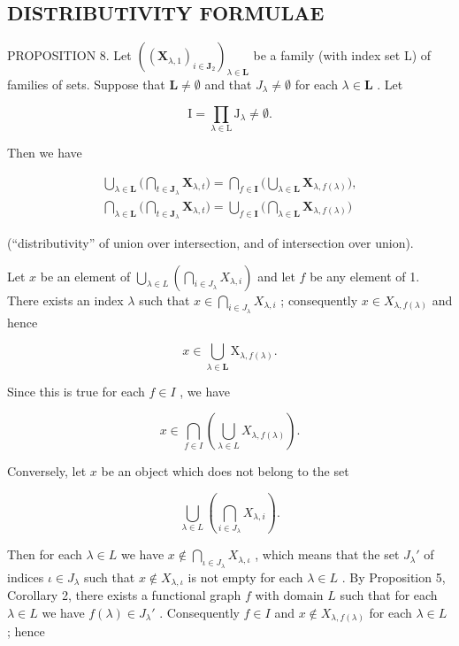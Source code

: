 \subsection{DISTRIBUTIVITY FORMULAE}

PROPOSITION 8. Let \(((\mathbf{X}_{\lambda,1})_{i\in \mathbf{J}_2})_{\lambda \in \mathbf{L}}\) be a family (with index set L) of families of sets. Suppose that \(\mathbf{L}\neq \emptyset\) and that \(J_{\lambda}\neq \emptyset\) for each \(\lambda \in \mathbf{L}\) . Let

\[
\mathrm{I} = \prod_ {\lambda \in \mathrm{L}} \mathrm{J} _ {\lambda} \neq \emptyset .
\]

Then we have

\[
\begin{array}{l} \bigcup_ {\lambda \in \mathbf {L}} \Big (\bigcap_ {t \in \mathbf {J} _ {\lambda}} \mathbf {X} _ {\lambda , t} \Big) = \bigcap_ {f \in \mathbf {I}} \Big (\bigcup_ {\lambda \in \mathbf {L}} \mathbf {X} _ {\lambda , f (\lambda)} \Big), \\ \bigcap_ {\lambda \in \mathbf {L}} \Big (\bigcap_ {t \in \mathbf {J} _ {\lambda}} \mathbf {X} _ {\lambda , t} \Big) = \bigcup_ {f \in \mathbf {I}} \Big (\bigcap_ {\lambda \in \mathbf {L}} \mathbf {X} _ {\lambda , f (\lambda)} \Big) \end{array}
\]

(``distributivity'' of union over intersection, and of intersection over union).

Let \(x\) be an element of \(\bigcup_{\lambda \in L} \left( \bigcap_{i \in J_{\lambda}} X_{\lambda, i} \right)\) and let \(f\) be any element of 1. There exists an index \(\lambda\) such that \(x \in \bigcap_{i \in J_{\lambda}} X_{\lambda, i}\) ; consequently \(x \in X_{\lambda, f(\lambda)}\) and hence

\[
x \in \bigcup_ {\lambda \in \mathbf {L}} \mathrm{X} _ {\lambda , f (\lambda)}.
\]

Since this is true for each \(f \in I\) , we have

\[
x \in \bigcap_ {f \in I} \left(\bigcup_ {\lambda \in L} X _ {\lambda , f (\lambda)}\right).
\]

Conversely, let \(x\) be an object which does not belong to the set

\[
\bigcup_ {\lambda \in L} \left(\bigcap_ {i \in J _ {\lambda}} X _ {\lambda , i}\right).
\]

Then for each \(\lambda \in L\) we have \(x \notin \bigcap_{\iota \in J_{\lambda}} X_{\lambda, \iota}\) , which means that the set \(J_{\lambda}'\) of indices \(\iota \in J_{\lambda}\) such that \(x \notin X_{\lambda, \iota}\) is not empty for each \(\lambda \in L\) . By Proposition 5, Corollary 2, there exists a functional graph \(f\) with domain \(L\) such that for each \(\lambda \in L\) we have \(f(\lambda) \in J_{\lambda}'\) . Consequently \(f \in I\) and \(x \notin X_{\lambda, f(\lambda)}\) for each \(\lambda \in L\) ; hence

